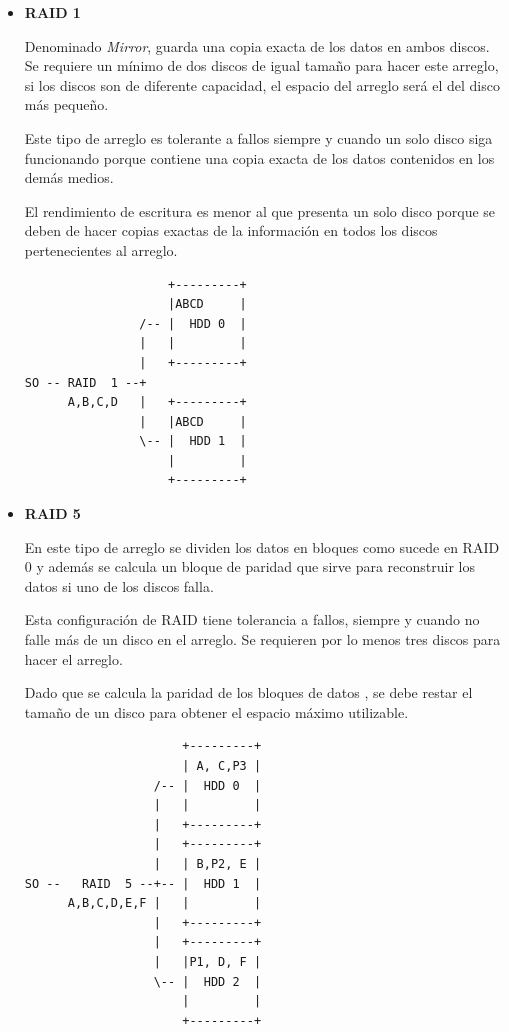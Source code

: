 \begin{itemize}
  \item \textbf{RAID 1}
  
Denominado \emph{Mirror}, guarda una copia exacta de los datos en ambos discos. Se requiere un m\'{i}nimo de dos discos de igual tama\~{n}o para hacer este arreglo, si los discos son de diferente capacidad, el espacio del arreglo ser\'{a} el del disco m\'{a}s peque\~{n}o.

Este tipo de arreglo es tolerante a fallos siempre y cuando un solo disco siga funcionando porque contiene una copia exacta de los datos contenidos en los dem\'{a}s medios.

El rendimiento de escritura es menor al que presenta un solo disco porque se deben de hacer copias exactas de la informaci\'{o}n en todos los discos pertenecientes al arreglo.

{
\scriptsize
\linespread{1}
\begin{verbatim}
                    +---------+
                    |ABCD     |
                /-- |  HDD 0  |
                |   |         |
                |   +---------+
SO -- RAID  1 --+
      A,B,C,D   |   +---------+
                |   |ABCD     |
                \-- |  HDD 1  |
                    |         |
                    +---------+
\end{verbatim}
}

  \item \textbf{RAID 5}

En este tipo de arreglo se dividen los datos en bloques como sucede en RAID 0 y adem\'{a}s se calcula un bloque de paridad que sirve para reconstruir los datos si uno de los discos falla.

Esta configuraci\'{o}n de RAID tiene tolerancia a fallos, siempre y cuando no falle m\'{a}s de un disco en el arreglo. Se requieren por lo menos tres discos para hacer el arreglo.

Dado que se calcula la paridad de los bloques de datos , se debe restar el tama\~{n}o de un disco para obtener el espacio m\'{a}ximo utilizable.
  
{
\scriptsize
\linespread{1}
\begin{verbatim}
                      +---------+
                      | A, C,P3 |
                  /-- |  HDD 0  |
                  |   |         |
                  |   +---------+
                  |   +---------+
                  |   | B,P2, E |
SO --   RAID  5 --+-- |  HDD 1  |
      A,B,C,D,E,F |   |         |
                  |   +---------+
                  |   +---------+
                  |   |P1, D, F |
                  \-- |  HDD 2  |
                      |         |
                      +---------+
\end{verbatim}
}


\end{itemize}
